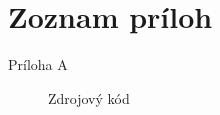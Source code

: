 \section*{Zoznam pr\'iloh}
\thispagestyle{empty}

\begin{description}
	\item[Príloha A] Zdrojový kód
\end{description}